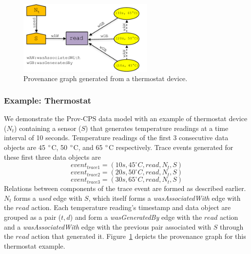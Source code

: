 \begin{figure}[h!]
\begin{center}

\includegraphics[width=0.6\textwidth]{prov_sensor_v3.pdf}
\end{center}
\caption{Provenance graph generated from a thermostat device.}
\label{prov_sensor}
\end{figure}

\subsubsection{Example: Thermostat}

We demonstrate the Prov-CPS data model with an example of thermostat device ($N_t$) containing a sensor ($S$) that generates temperature readings at a time interval of 10 seconds. Temperature readings of the first 3 consecutive data objects are 45 $\degree$C, 50 $\degree$C, and 65 $\degree$C respectively. Trace events generated for these first three data objects are
\[event_{trace1} = (10 s, 45 ^{\circ}C, read, N_t, S)\]  
\[event_{trace2} = (20 s, 50 ^{\circ}C, read, N_t, S)\]  
\[event_{trace3} = (30 s, 65 ^{\circ}C, read, N_t, S)\]
Relations between components of the trace event are formed as described earlier. $N_t$ forms a \textit{used} edge with $S$, which itself forms a \textit{wasAssociatedWith} edge with the $read$ action. Each temperature reading's timestamp and data object are grouped as a pair ($t, d$) and form a \textit{wasGeneratedBy} edge with the $read$ action and a \textit{wasAssociatedWith} edge with the previous pair associated with $S$ through the $read$ action that generated it. Figure~\ref{prov_sensor} depicts the provenance graph for this thermostat example.








